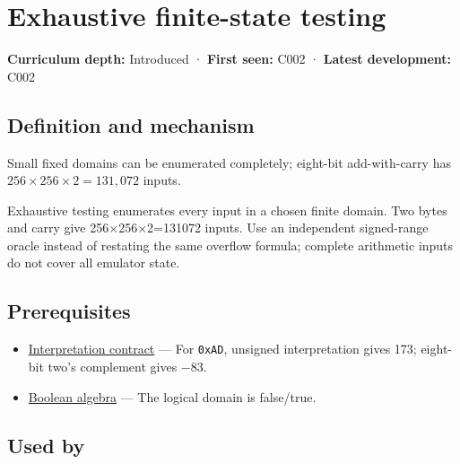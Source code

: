 \hypertarget{appendix-05db24ccc28a}{}\label{referencestart:appendix-05db24ccc28a}
\section{Exhaustive finite-state testing}\label{appendix-05db24ccc28a-exhaustive-finite-state-testing}

\hypertarget{appendix-05db24ccc28a-exhaustive-finite-state-testing}{}

\textbf{Curriculum depth:} Introduced · \textbf{First seen:} C002 · \textbf{Latest development:} C002

\begin{allmightroledefinition}

\subsection{Definition and mechanism}\label{appendix-05db24ccc28a-definition-and-mechanism}

\hypertarget{appendix-05db24ccc28a-definition-and-mechanism}{}

Small fixed domains can be enumerated completely; eight-bit add-with-carry has \(256\times256\times2=131{,}072\) inputs.

\end{allmightroledefinition}

Exhaustive testing enumerates every input in a chosen finite domain. Two bytes and carry give 256×256×2=131072 inputs. Use an independent signed-range oracle instead of restating the same overflow formula; complete arithmetic inputs do not cover all emulator state.

\subsection{Prerequisites}\label{appendix-05db24ccc28a-prerequisites}

\hypertarget{appendix-05db24ccc28a-prerequisites}{}

\begin{itemize}
\tightlist
\item
  \hyperref[appendix-f414bd4ed05c]{Interpretation contract} --- For \texttt{0xAD}, unsigned interpretation gives 173; eight-bit two's complement gives −83.
\item
  \hyperref[appendix-24475e1596a8]{Boolean algebra} --- The logical domain is false/true.
\end{itemize}

\subsection{Used by}\label{appendix-05db24ccc28a-used-by}


